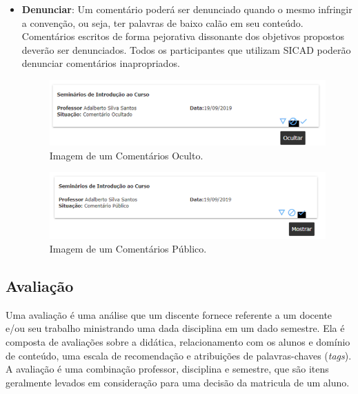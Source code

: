 \documentclass[12pt, a4paper]{report}
\begin{document}
\begin{itemize}
\item \textbf{Denunciar}: Um comentário poderá ser denunciado quando o mesmo infringir a convenção, ou seja, ter palavras de baixo calão em seu conteúdo. Comentários escritos de forma pejorativa dissonante dos objetivos propostos deverão ser denunciados. Todos os participantes que utilizam \ac{SICAD} poderão denunciar comentários inapropriados.

\begin{figure}
\centering
\includegraphics[scale=0.7]{comentario_oculto.png}
\caption{Imagem de um Comentários Oculto.}
\label{fig:comentario_oculto}
\end{figure}

\begin{figure}
\centering
\includegraphics[scale=0.7]{comentario_publico.png}
\caption{Imagem de um Comentários Público.}
\label{fig:comentario_publico}
\end{figure}

\end{itemize}
\subsection{Avaliação}

Uma avaliação é uma análise que um discente fornece referente a um docente e/ou seu trabalho ministrando uma dada disciplina em um dado semestre. Ela é composta de avaliações sobre a didática, relacionamento com os alunos e domínio de conteúdo, uma escala de recomendação e atribuições de palavras-chaves (\textit{tags}). A avaliação é uma combinação professor, disciplina e semestre, que são itens geralmente levados em consideração para uma decisão da matricula de um aluno.
\end{document}
